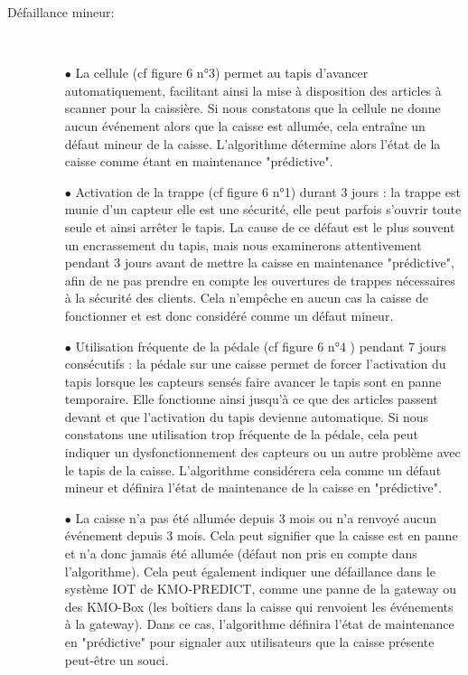 \documentclass[12pt]{article}
\begin{document}
\vspace{12pt}
\begin{description}


    \item[Défaillance mineur:]   
        \begin{itemize}     
            \item[~]             
            \item[$\bullet$] La cellule (cf figure 6 n°3) permet au tapis d'avancer automatiquement, facilitant ainsi la mise à disposition des articles à scanner pour la caissière. Si nous constatons que la cellule ne donne aucun événement alors que la caisse est allumée, cela entraîne un défaut mineur de la caisse. L'algorithme détermine alors l'état de la caisse comme étant en maintenance "prédictive".
            
            \item[$\bullet$]Activation de la trappe (cf figure 6 n°1) durant 3 jours : la trappe est munie d'un capteur elle est une  sécurité, elle peut parfois s'ouvrir toute seule et ainsi arrêter le tapis. La cause de ce défaut est le plus souvent un encrassement du tapis, mais nous examinerons attentivement pendant 3 jours avant de mettre la caisse en maintenance "prédictive", afin de ne pas prendre en compte les ouvertures de trappes nécessaires à la sécurité des clients. Cela n'empêche en aucun cas la caisse de fonctionner et est donc considéré comme un défaut mineur.
            
            \item[$\bullet$] Utilisation fréquente de la pédale (cf figure 6 n°4 ) pendant 7 jours consécutifs : la pédale sur une caisse permet de forcer l'activation du tapis lorsque les capteurs sensés faire avancer le tapis sont en panne temporaire. Elle fonctionne ainsi jusqu'à ce que des articles passent devant et que l'activation du tapis devienne automatique. Si nous constatons une utilisation trop fréquente de la pédale, cela peut indiquer un dysfonctionnement des capteurs ou un autre problème avec le tapis de la caisse. L'algorithme considérera cela comme un défaut mineur et définira l'état de maintenance de la caisse en "prédictive".
            
             \item[$\bullet$] La caisse n'a pas été allumée depuis 3 mois ou n'a renvoyé aucun événement depuis 3 mois. Cela peut signifier que la caisse est en panne et n'a donc jamais été allumée (défaut non pris en compte dans l'algorithme). Cela peut également indiquer une défaillance dans le système IOT de KMO-PREDICT, comme une panne de la gateway ou des KMO-Box (les boîtiers dans la caisse qui renvoient les événements à la gateway). Dans ce cas, l'algorithme définira l'état de maintenance en "prédictive" pour signaler aux utilisateurs que la caisse présente peut-être un souci.
             

\end{itemize}
\end{description}
\end{document}
